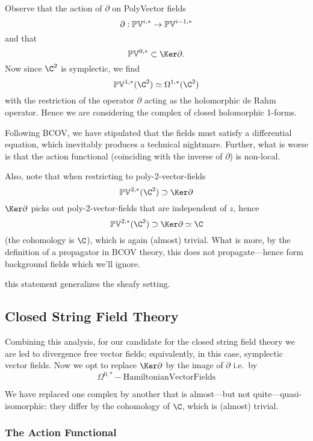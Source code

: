\documentclass[12pt]{amsart}
\begin{document}
Observe that the action of $\partial$ on PolyVector fields $$\partial :
\mathbb{PV}^{i,*} \rightarrow \mathbb{PV}^{i-1,*}$$
and that $$\mbf{PV}^{0,*}\subset \Ker\partial.$$ Now since $\C^2$ is symplectic, we
find$$\mbf{PV}^{1,*}(\C^2) \simeq
\Omega^{1,*}(\C^2)$$ with the restriction of the operator $\partial$ acting as the holomorphic de
Rahm operator. Hence we are considering the complex of
closed\footnotemark{} holomorphic
1-forms.

\begin{rmk}
  Following BCOV, we have stipulated that the fields must satisfy a
  differential equation, which inevitably produces a technical nightmare.
  Further, what is worse is that the action functional (coinciding with the
  inverse of $\partial$) is non-local.
\end{rmk}

Also, note that when restricting to poly-2-vector-fields $$\mbf{PV}^{2,*}(\C^2) \supset \Ker\partial$$
$\Ker\partial$ picks out poly-2-vector-fields that are independent of $z$,
hence
$$\mbf{PV}^{2,*}(\C^2) \supset \Ker\partial \simeq \C$$
(the cohomology is $\C$), which is again (almost) trivial. What is more, by the
definition of a propagator in BCOV theory, this does not propagate---hence form
background fields which we'll ignore.

\begin{rmk}
  this statement generalizes the sheafy setting.
\end{rmk}

\subsection{Closed String Field Theory}

Combining this analysis, for our candidate for the closed string field
theory we are led to divergence free vector fields; equivalently, in this case, symplectic
vector fields. Now we opt to replace $\Ker\partial$ by the image
of $\partial$ i.e.\ by $$\Omega^{0,*} - \mathrm{Hamiltonian Vector
Fields}$$

\begin{rmk}
  We have replaced one complex by another that is almost---but not
  quite---quasi-isomorphic: they differ by the cohomology of $\C$, which is
  (almost) trivial.
\end{rmk}

\subsubsection{The Action Functional}
\end{document}
